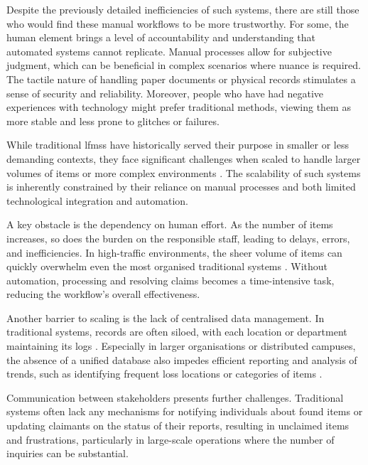 Despite the previously detailed inefficiencies of such systems, there are still those who would find these manual workflows to be more trustworthy. For some, the human element brings a level of accountability and understanding that automated systems cannot replicate. Manual processes allow for subjective judgment, which can be beneficial in complex scenarios where nuance is required. The tactile nature of handling paper documents or physical records stimulates a sense of security and reliability. Moreover, people who have had negative experiences with technology might prefer traditional methods, viewing them as more stable and less prone to glitches or failures.


While traditional \acp{lfms} have historically served their purpose in smaller or less demanding contexts, they face significant challenges when scaled to handle larger volumes of items or more complex environments \cite{Mayura2024}. The scalability of such systems is inherently constrained by their reliance on manual processes and both limited technological integration and automation.

A key obstacle is the dependency on human effort. As the number of items increases, so does the burden on the responsible staff, leading to delays, errors, and inefficiencies. In high-traffic environments, the sheer volume of items can quickly overwhelm even the most organised traditional systems \cite{Yao2019}. Without automation, processing and resolving claims becomes a time-intensive task, reducing the workflow's overall effectiveness. 

Another barrier to scaling is the lack of centralised data management. In traditional systems, records are often siloed, with each location or department maintaining its logs \cite{Soumya2024}. Especially in larger organisations or distributed campuses, the absence of a unified database also impedes efficient reporting and analysis of trends, such as identifying frequent loss locations or categories of items \cites{Sinha2024, Soumya2024}.

Communication between stakeholders presents further challenges. Traditional systems often lack any mechanisms for notifying individuals about found items or updating claimants on the status of their reports, resulting in unclaimed items \cite{Zhou2023} and frustrations, particularly in large-scale operations where the number of inquiries can be substantial.

